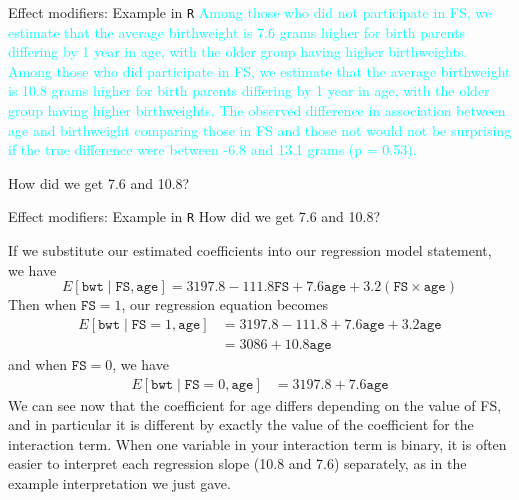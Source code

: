 \documentclass[10pt,t]{beamer}
\begin{document}
\begin{frame}{Effect modifiers: Example in \texttt{R}}
\textcolor{cyan}{Among those who did not participate in FS, we estimate that the average birthweight is 7.6 grams higher for birth parents differing by 1 year in age, with the older group having higher birthweights. Among those who did participate in FS, we estimate that the average birthweight is 10.8 grams higher for birth parents differing by 1 year in age, with the older group having higher birthweights. The observed difference in association between age and birthweight comparing those in FS and those not would not be surprising if the true difference were between -6.8 and 13.1 grams (p = 0.53).}

\vspace{0.3cm}

How did we get 7.6 and 10.8?
\end{frame}

\begin{frame}{Effect modifiers: Example in \texttt{R}}
	\vspace{-0.4cm}
How did we get 7.6 and 10.8?

\vspace{0.3cm} If we substitute our estimated coefficients into our regression model statement, we have
$$
E[\texttt{bwt} \mid \texttt{FS}, \texttt{age}] = 3197.8 - 111.8 \texttt{FS} + 7.6 \texttt{age} + 3.2 (\texttt{FS} \times \texttt{age}) 
$$
\pause Then when $\texttt{FS} = 1$, our regression equation becomes
\begin{align*}
E[\texttt{bwt} \mid \texttt{FS} = 1, \texttt{age}] & = 3197.8 - 111.8  + 7.6 \texttt{age} + 3.2 \texttt{age} \\
& = 3086 + 10.8 \texttt{age}
\end{align*} \pause
and when $\texttt{FS} = 0$, we have
\begin{align*}
E[\texttt{bwt} \mid \texttt{FS} = 0, \texttt{age}] & = 3197.8  + 7.6 \texttt{age} 
\end{align*} \pause
\small We can see now that the coefficient for age differs depending on the value of FS, and in particular it is different by exactly the value of the coefficient for the interaction term. When one variable in your interaction term is binary, it is often easier to interpret each regression slope (10.8 and 7.6) separately, as in the example interpretation we just gave.

\end{frame}
\end{document}
